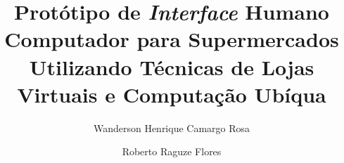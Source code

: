 \documentclass{article}
\title{Protótipo de \emph{Interface} Humano Computador para Supermercados
Utilizando Técnicas de Lojas Virtuais e Computação Ubíqua}
\author{Wanderson Henrique Camargo Rosa \and Roberto Raguze Flores}
\begin{document}
\maketitle{}





\end{document}
